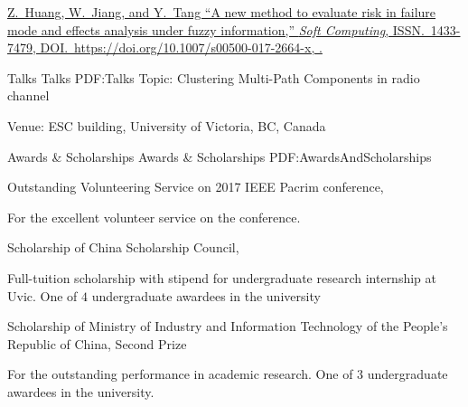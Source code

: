 \documentclass[letterpaper,MMMyyyy,nonstopmode]{simpleresumecv}
\begin{document}
\begin{Body}
\Gap
\NumberedItem{[5]}
\href{http://www.example.com/my-paper-doi-4}
{\underline{Z.~Huang}, W.~Jiang, and Y.~Tang
``A new method to evaluate risk in failure mode and effects analysis under fuzzy information,''
\textit{Soft Computing},
ISSN.~1433-7479,
DOI.~https://doi.org/10.1007/s00500-017-2664-x,
.}

\endgroup

\BigGap
\SubSection
{Talks}
{Talks}
{PDF:Talks}
\BulletItem
Topic: Clustering Multi-Path Components in radio channel
\hfill
{}
\begin{Detail}
\SubBulletItem
Venue:
ESC building, University of Victoria, BC, Canada
\end{Detail}







\Section
{Awards \&\newline
Scholarships}
{Awards \& Scholarships}
{PDF:AwardsAndScholarships}

\BulletItem
Outstanding Volunteering Service on 2017 IEEE Pacrim conference,
\hfill
{}
\begin{Detail}
\Item
For the excellent volunteer service on the conference.
\end{Detail}
\Gap
\BulletItem
Scholarship of China Scholarship Council,
\hfill
{}
\begin{Detail}
\Item
Full-tuition scholarship with stipend for undergraduate research internship at Uvic. One of $4$ undergraduate awardees in the university
\end{Detail}
\Gap
\BulletItem
Scholarship of Ministry of Industry and Information Technology of the People’s Republic of China,
Second Prize
\hfill
{}
\begin{Detail}
\Item
For the outstanding performance in academic research. One of $3$ undergraduate awardees in the university.
\end{Detail}




\end{Body}
\end{document}
